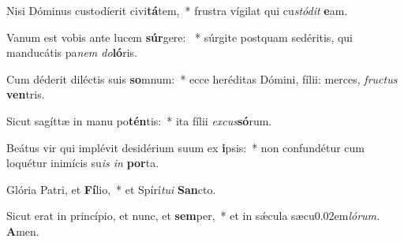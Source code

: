 \item Nisi Dóminus custodíerit civi\textbf{tá}tem,~* frustra vígilat qui cu\hspace{0.03em}\textit{stódit} \textbf{e}am.
\item Vanum est vobis ante lucem \textbf{súr}gere: ~* súrgite postquam sedéritis, qui manducátis pa\textit{nem do}\textbf{ló}ris.
\item Cum déderit diléctis suis \textbf{so}mnum:~* ecce heréditas Dómini, fílii: merces, \textit{fructus} \textbf{ven}tris.
\item Sicut sagíttæ in manu po\textbf{tén}tis:~* ita fílii \textit{excus}\textbf{só}rum.
\item Beátus vir qui implévit desidérium suum ex \textbf{i}psis:~* non confundétur cum loquétur inimícis su\textit{is in} \textbf{por}ta.
\item Glória Patri, et \textbf{Fí}lio,~* et Spírí\textit{tui} \textbf{San}cto.
\item Sicut erat in princípio, et nunc, et \textbf{sem}per,~* et in sǽcula sæcu\kern 0.02em\textit{lórum.} \textbf{A}men.